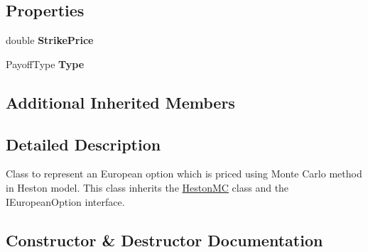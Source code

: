 \subsection*{Properties}
\begin{DoxyCompactItemize}
\item 
\mbox{\label{class_heston_model_1_1_classes_1_1_european_option_m_c_ae702bd8e0a784043632a009876288d9f}} 
double {\bfseries Strike\+Price}
\item 
\mbox{\label{class_heston_model_1_1_classes_1_1_european_option_m_c_a37005a7e205388c45ed0aa628ac0e342}} 
Payoff\+Type {\bfseries Type}
\end{DoxyCompactItemize}
\subsection*{Additional Inherited Members}


\subsection{Detailed Description}
Class to represent an European option which is priced using Monte Carlo method in Heston model. This class inherits the \mbox{\hyperlink{class_heston_model_1_1_classes_1_1_heston_m_c}{Heston\+MC}} class and the I\+European\+Option interface. 



\subsection{Constructor \& Destructor Documentation}
\mbox{\label{class_heston_model_1_1_classes_1_1_european_option_m_c_ad84627e82cbec3bf55a08521ecc7b049}} 
